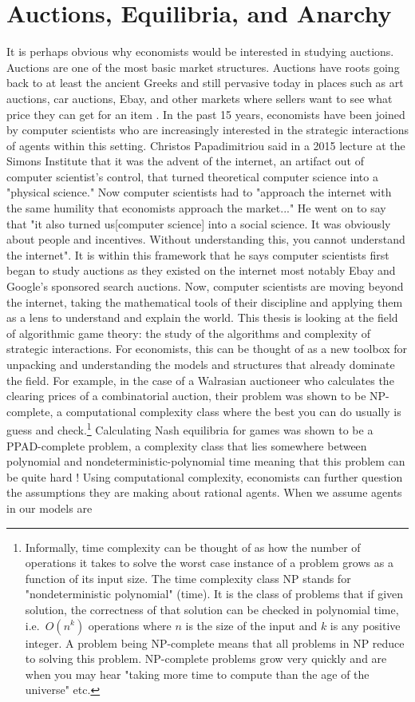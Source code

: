 \documentclass[12pt,twoside]{reedthesis}
\begin{document}
\section{Auctions, Equilibria, and Anarchy}
It is perhaps obvious why economists would be interested in studying auctions. Auctions are one of the most basic market structures. Auctions have roots going back to at least the ancient Greeks and still pervasive today in places such as art auctions, car auctions, Ebay, and other markets where sellers want to see what price they can get for an item \citep{Mochon2015}. In the past 15 years, economists have been joined by computer scientists who are increasingly interested in the strategic interactions of agents within this setting. Christos Papadimitriou said in a 2015 lecture at the Simons Institute that it was the advent of the internet, an artifact out of computer scientist's control, that turned theoretical computer science into a "physical science." Now computer scientists had to "approach the internet with the same humility that economists approach the market..." He went on to say that "it also turned us[computer science] into a social science. It was obviously about people and incentives. Without understanding this, you cannot understand the internet"\citep{Papadimitriou2015}. It is within this framework that he says computer scientists first began to study auctions as they existed on the internet most notably Ebay and Google's sponsored search auctions. Now, computer scientists are moving beyond the internet, taking the mathematical tools of their discipline and applying them as a lens to understand and explain the world. This thesis is looking at the field of algorithmic game theory: the study of the algorithms and complexity of strategic interactions. For economists, this can be thought of as a new toolbox for unpacking and understanding the models and structures that already dominate the field. For example, in the case of a Walrasian auctioneer who calculates the clearing prices of a combinatorial auction, their problem was shown to be NP-complete, a computational complexity class where the best you can do usually is guess and check.\footnote{Informally, time complexity can be thought of as how the number of operations it takes to solve the worst case instance of a problem grows as a function of its input size. The time complexity class NP stands for "nondeterministic polynomial" (time). It is the class of problems that if given solution, the correctness of that solution can be checked in polynomial time, i.e.~$O(n^k)$ operations where $n$ is the size of the input and $k$ is any positive integer. A problem being NP-complete means that all problems in NP reduce to solving this problem. NP-complete problems grow very quickly and are when you may hear "taking more time to compute than the age of the universe" etc.} Calculating Nash equilibria for games was shown to be a PPAD-complete problem, a complexity class that lies somewhere between polynomial and nondeterministic-polynomial time meaning that this problem can be quite hard \citep{Papadimitriou2015}! Using computational complexity, economists can further question the assumptions they are making about rational agents. When we assume agents in our models are 
\end{document}
